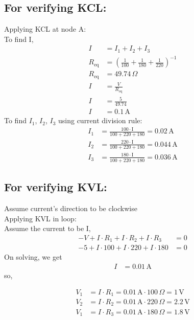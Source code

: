 \documentclass[a4paper,12pt]{article}
\begin{document}
\subsection{For verifying KCL: }
Applying  KCL at node A: \\
To find I,
\begin{align}
    I &= I_1 + I_2 + I_3 \\
    R_{\text{eq}} &= \left( \frac{1}{100} + \frac{1}{180} + \frac{1}{220} \right)^{-1} \\
    R_{\text{eq}} &= 49.74 \, \Omega \\[1em]
    I &= \frac{V}{R_{\text{eq}}} \\
    I &= \frac{5}{49.74} \\
    I &= 0.1 \, \text{A}
\end{align}
To find \(I_1\), \(I_2\), \(I_3\) using current division rule:
\begin{align}
    I_1 &= \frac{100 \cdot \text{I}}{100 + 220 + 180} = 0.02 \, \text{A} \\
    I_2 &= \frac{220 \cdot \text{I}}{100 + 220 + 180} = 0.044 \, \text{A} \\
    I_3 &= \frac{180 \cdot \text{I}}{100 + 220 + 180} = 0.036 \, \text{A}
\end{align}

\subsection{For verifying KVL: }
{Assume current's direction to be clockwise} \\
Applying KVL in loop: \\
Assume the current to be I, \\
\begin{align}
-V + I \cdot R_1 + I \cdot R_2 + I \cdot R_3 &= 0 \\
-5 + I \cdot 100 + I \cdot 220 + I \cdot 180 &= 0
\end{align}
On solving, we get
\begin{align}
I &= 0.01 \, \text{A}
\end{align}
so,

\begin{align}
    V_1 &= I \cdot R_1 \nonumber = 0.01 \, \text{A} \cdot 100 \, \Omega \nonumber = 1 \, \text{V} \\
    V_2 &= I \cdot R_2 \nonumber = 0.01 \, \text{A} \cdot 220 \, \Omega \nonumber = 2.2 \, \text{V} \\
    V_1 &= I \cdot R_3 \nonumber = 0.01 \, \text{A} \cdot 180 \, \Omega \nonumber = 1.8 \, \text{V}
\end{align}
\end{document}

